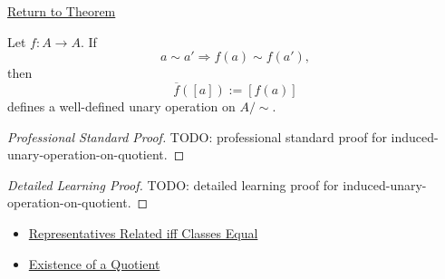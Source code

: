 \newpage
{}
\label{prf:induced-unary-operation-on-quotient}

\begin{remark*}[Return]
\hyperref[thm:induced-unary-operation-on-quotient]{Return to Theorem}
\end{remark*}

\begin{theorem*}
Let $f:A\to A$. If
\[
a\sim a'\Longrightarrow f(a)\sim f(a'),
\]
then
\[
\overline{f}([a]):=[f(a)]
\]
defines a well-defined unary operation on $A/{\sim}$.
\end{theorem*}

\begin{proof}[Professional Standard Proof]
\LRAProofBodyStart
TODO: professional standard proof for induced-unary-operation-on-quotient.
\end{proof}

\begin{proof}[Detailed Learning Proof]
\LRAProofBodyStart
TODO: detailed learning proof for induced-unary-operation-on-quotient.
\end{proof}

\begin{remark*}
\end{remark*}

\begin{dependencies}
\begin{itemize}
  \item \hyperref[prop:representatives-related-iff-classes-equal]{Representatives Related iff Classes Equal}
  \item \hyperref[thm:existence-of-a-quotient]{Existence of a Quotient}
\end{itemize}
\end{dependencies}

\clearpage
